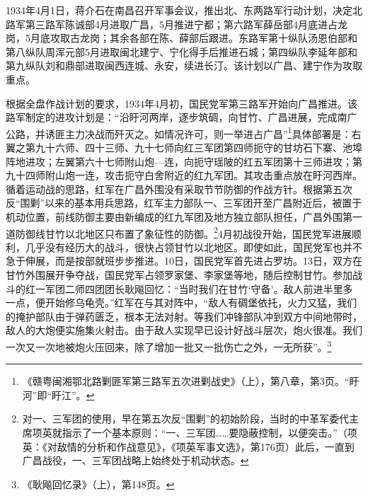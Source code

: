 1934年4月1日，蒋介石在南昌召开军事会议，推出北、东两路军行动计划，决定北路军第三路军陈诚部4月进取广昌，5月推进宁都；第六路军薛岳部4月底进占龙岗，5月底攻取古龙岗；其余各部在陈、薛部后跟进。东路军第十纵队汤恩伯部和第八纵队周浑元部5月进取闽北建宁、宁化得手后推进石城；第四纵队李延年部和第九纵队刘和鼎部进取闽西连城、永安，续进长汀。该计划以广昌、建宁作为攻取重点。


根据全盘作战计划的要求，1934年4月初，国民党军第三路军开始向广昌推进。该路军制定的进攻计划是：“沿盱河两岸，逐步筑碉，向甘竹、广昌进展，完成南广公路，并诱匪主力决战而歼灭之。如情况许可，则一举进占广昌”\footnote{《赣粤闽湘鄂北路剿匪军第三路军五次进剿战史》（上），第八章，第3页。“盱河”即“盱江”。}具体部署是：右翼之第九十六师、四十三师、九十七师向红三军团第四师扼守的甘坊石下寨、池埠阵地进攻；左翼第六十七师附山炮—连，向扼守瑶陂的红五军团第十三师进攻；第九十四师附山炮一连，攻击扼守白舍附近的红九军团。其攻击重点放在盱河西岸。循着运动战的思路，红军在广昌外围没有采取节节防御的作战方针。根据第五次反“围剿”以来的基本用兵思路，红军主力部队一、三军团开至广昌附近后，被置于机动位置，前线防御主要由新编成的红九军团及地方独立部队担任，广昌外围第一道防御线甘竹以北地区只布置了象征性的防御。\footnote{对一、三军团的使用，早在第五次反“围剿”的初始阶段，当时的中革军委代主席项英就指示了一个基本原则：“一、三军团……要隐蔽控制，以便突击。”（项英：《对敌情的分析和作战意见》，《项英军事文选》，第176页）此后，一直到广昌战役，一、三军团战略上始终处于机动状态。}4月初战役开始，国民党军进展顺利，几乎没有经历大的战斗，很快占领甘竹以北地区。即使如此，国民党军也并不急于伸展，而是按部就班步步推进。10日，国民党军首先进占罗坊。13日，双方在甘竹外围展开争夺战，国民党军占领罗家堡、李家堡等地，随后控制甘竹。参加战斗的红一军团二师四团团长耿飚回忆：“当时我们在甘竹‘守备’。敌人前进半里多一点，便开始修乌龟壳。”红军在与其对阵中，“敌人有碉堡依托，火力又猛，我们的掩护部队由于弹药匮乏，根本无法对射。等我们冲锋部队冲到双方中间地带时，敌人的大炮便实施集火射击。由于敌人实现早已设计好战斗层次，炮火很准。我们一次又一次地被炮火压回来，除了增加一批又一批伤亡之外，一无所获”。\footnote{《耿飚回忆录》（上），第148页。}


